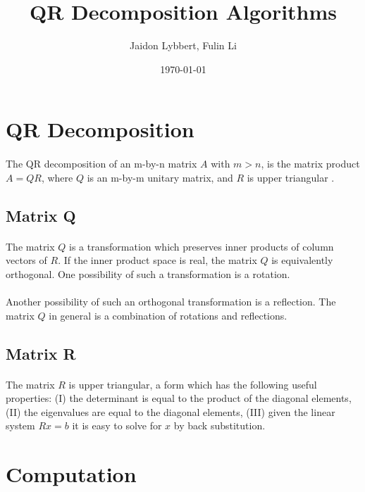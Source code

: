 \documentclass{article}
\title{QR Decomposition Algorithms}
\author{Jaidon Lybbert, Fulin Li}
\date{\today{}}
\begin{document}
\maketitle{}
\tableofcontents{}
\listofalgorithms{}

\section{QR Decomposition}
\paragraph{}
The QR decomposition of an m-by-n matrix $A$ with $m>n$, is the matrix product $A = QR$, where $Q$ is an 
m-by-m unitary matrix, and $R$ is upper triangular \cite{bhaskar86qr}.

\subsection{Matrix Q}
\paragraph{}
The matrix $Q$ is a transformation which preserves inner products of column vectors of $R$. If the 
inner product space is real, the matrix $Q$ is equivalently orthogonal. One possibility of such a 
transformation is a rotation.
\paragraph{}
Another possibility of such an orthogonal transformation is a reflection. The matrix $Q$ in general 
is a combination of rotations and reflections.

\subsection{Matrix R}
\paragraph{}
The matrix $R$ is upper triangular, a form which has the following useful properties: (I) the determinant is equal to the product of the diagonal elements, (II) the eigenvalues are equal to the diagonal elements, (III) given the linear system $Rx = b$ it is easy to solve for $x$ by back substitution.

\section{Computation}
\end{document}
